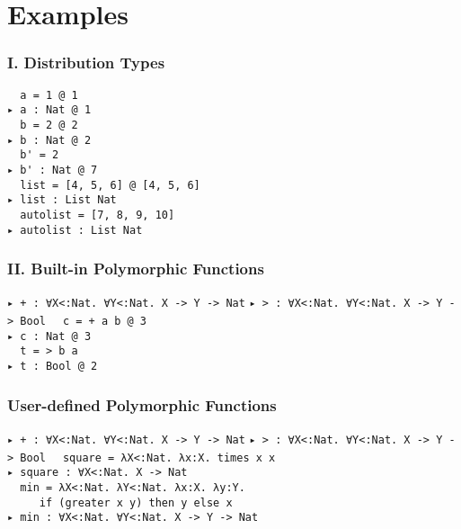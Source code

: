 \documentclass{beamer}
\begin{document}
\section{Examples}

\begin{frame}[fragile]
\frametitle{I. Distribution Types}

\begin{example}
    \verb|  a = 1 @ 1|
    \\
    \verb|▸ a : Nat @ 1|
    \\
    \verb|  b = 2 @ 2|
    \\
    \verb|▸ b : Nat @ 2|
    \\
    \verb|  b' = 2|
    \\
    \verb|▸ b' : Nat @ 7|
    \\
    \verb|  list = [4, 5, 6] @ [4, 5, 6]|
    \\
    \verb|▸ list : List Nat|
    \\
    \verb|  autolist = [7, 8, 9, 10]|
    \\
    \verb|▸ autolist : List Nat|
\end{example}

\end{frame}

\begin{frame}[fragile]
    \frametitle{II. Built-in Polymorphic Functions}

    \begin{example}
        \verb|▸ + : ∀X<:Nat. ∀Y<:Nat. X -> Y -> Nat|
        \verb|▸ > : ∀X<:Nat. ∀Y<:Nat. X -> Y -> Bool|
        \verb|  c = + a b @ 3|
        \\
        \verb|▸ c : Nat @ 3|
        \\
        \verb|  t = > b a|
        \\
        \verb|▸ t : Bool @ 2|
    \end{example}

\end{frame}
\begin{frame}[fragile]
    \frametitle{User-defined Polymorphic Functions}
\begin{example}
    \verb|▸ + : ∀X<:Nat. ∀Y<:Nat. X -> Y -> Nat|
    \verb|▸ > : ∀X<:Nat. ∀Y<:Nat. X -> Y -> Bool|
    \verb|  square = λX<:Nat. λx:X. times x x|
    \\
    \verb|▸ square : ∀X<:Nat. X -> Nat|
    \\
    \verb|  min = λX<:Nat. λY<:Nat. λx:X. λy:Y.|
    \\
    \verb|     if (greater x y) then y else x|
    \\
    \verb|▸ min : ∀X<:Nat. ∀Y<:Nat. X -> Y -> Nat|
\end{example}

\end{frame}
\end{document}
